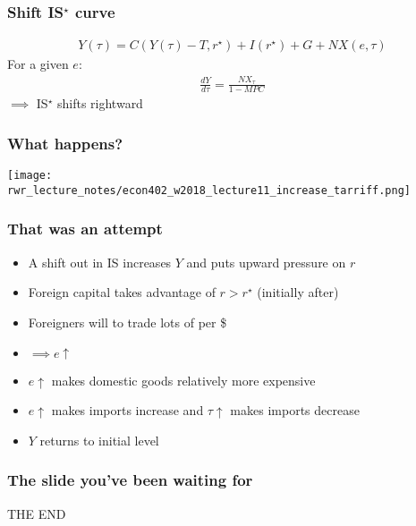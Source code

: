\documentclass[presentation,dvipsnames]{beamer}
\renewcommand{\pounds}{\text{\textsterling}{ }}
\begin{document}
\begin{frame}
\frametitle{Shift IS$^{\star}$ curve}
\begin{align*}
Y(\tau) = C(Y(\tau) - T, r^{\star}) + I(r^{\star}) + G + NX(e,\tau)
\end{align*}
For a given $e$:
\begin{align*}
\frac{dY}{d\tau} = \frac{NX_{\tau}}{1-MPC}
\end{align*}
$\implies$ IS$^{\star}$ shifts rightward
\end{frame}

\begin{frame}
\frametitle{What happens?}
\centerline{\texttt{[image: rwr\_lecture\_notes/econ402\_w2018\_lecture11\_increase\_tarriff.png]}}
\end{frame}

\begin{frame}
\frametitle{That was an attempt}
\begin{itemize}[label={--}]
\item A shift out in IS increases $Y$ and puts upward pressure on $r$
\item Foreign capital takes advantage of $r > r^{\star}$ (initially after)
\item Foreigners will to trade lots of \pounds per \$
\item $\implies e \uparrow$ 
\item $e \uparrow$ makes domestic goods relatively more expensive
\item $e \uparrow$ makes imports increase and $\tau \uparrow$ makes imports decrease
\item $Y$ returns to initial level
\end{itemize}
\end{frame}

\begin{frame}
\frametitle{The slide you've been waiting for}
\centering
{\Huge THE END}
\end{frame}


\end{document}
